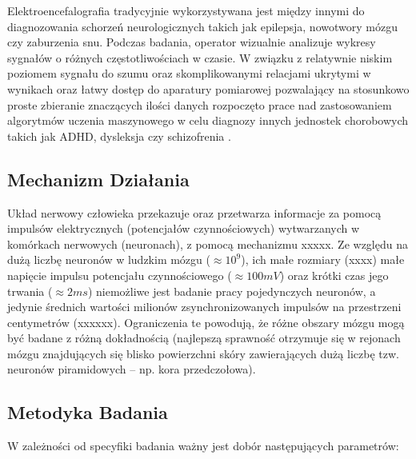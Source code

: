 \documentclass{./assets/wfis}
\begin{document}
Elektroencefalografia tradycyjnie wykorzystywana jest między innymi do diagnozowania schorzeń neurologicznych takich jak epilepsja, nowotwory mózgu czy zaburzenia snu. Podczas badania, operator wizualnie analizuje wykresy sygnałów o różnych częstotliwościach w czasie. W związku z relatywnie niskim poziomem sygnału do szumu oraz skomplikowanymi relacjami ukrytymi w wynikach oraz łatwy dostęp do aparatury pomiarowej pozwalający na stosunkowo proste zbieranie znaczących ilości danych rozpoczęto prace nad zastosowaniem algorytmów uczenia maszynowego w celu diagnozy innych jednostek chorobowych takich jak ADHD, dysleksja czy schizofrenia \cite{ahire_comprehensive_2022, joshi_review_2021, clarke_eeg_2002}.

\subsection{Mechanizm Działania}

Układ nerwowy człowieka przekazuje oraz przetwarza informacje za pomocą impulsów elektrycznych (potencjałów czynnościowych) wytwarzanych w komórkach nerwowych (neuronach), z pomocą mechanizmu xxxxx. Ze względu na dużą liczbę neuronów w ludzkim mózgu ($\approx10^9$\cite{herculano-houzel_human_2009}), ich małe rozmiary (xxxx) małe napięcie impulsu potencjału czynnościowego ($\approx100mV$\cite{biga_anatomy_2019}) oraz krótki czas jego trwania ($\approx2ms$\cite{biga_anatomy_2019}) niemożliwe jest badanie pracy pojedynczych neuronów, a jedynie średnich wartości milionów zsynchronizowanych impulsów na przestrzeni centymetrów (xxxxxx). Ograniczenia te powodują, że różne obszary mózgu mogą być badane z różną dokładnością (najlepszą sprawność otrzymuje się w rejonach mózgu znajdujących się blisko powierzchni skóry zawierających dużą liczbę tzw. neuronów piramidowych – np. kora przedczołowa).

\subsection{Metodyka Badania}

W zależności od specyfiki badania ważny jest dobór następujących parametrów:
\end{document}
